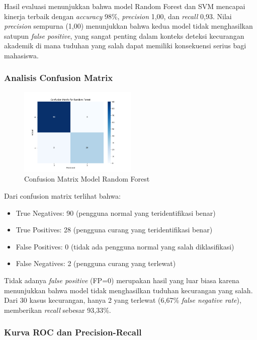 Hasil evaluasi menunjukkan bahwa model Random Forest dan SVM mencapai kinerja terbaik dengan \textit{accuracy} 98\%, \textit{precision} 1,00, dan \textit{recall} 0,93. Nilai \textit{precision} sempurna (1,00) menunjukkan bahwa kedua model tidak menghasilkan satupun \textit{false positive}, yang sangat penting dalam konteks deteksi kecurangan akademik di mana tuduhan yang salah dapat memiliki konsekuensi serius bagi mahasiswa.

\subsubsection{Analisis Confusion Matrix}

\begin{figure}[htbp]
    \centering
    \includegraphics[width=0.5\textwidth]{figures/confusion_matrix_Random Forest.png}
    \caption{Confusion Matrix Model Random Forest}
    \label{fig:confusionMatrix}
\end{figure}

Dari confusion matrix terlihat bahwa:
\begin{itemize}
    \item True Negatives: 90 (pengguna normal yang teridentifikasi benar)
    \item True Positives: 28 (pengguna curang yang teridentifikasi benar)
    \item False Positives: 0 (tidak ada pengguna normal yang salah diklasifikasi)
    \item False Negatives: 2 (pengguna curang yang terlewat)
\end{itemize}

Tidak adanya \textit{false positive} (FP=0) merupakan hasil yang luar biasa karena menunjukkan bahwa model tidak menghasilkan tuduhan kecurangan yang salah. Dari 30 kasus kecurangan, hanya 2 yang terlewat (6,67\% \textit{false negative rate}), memberikan \textit{recall} sebesar 93,33\%.

\subsubsection{Kurva ROC dan Precision-Recall}

